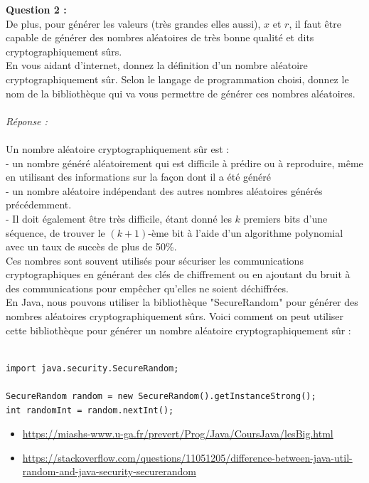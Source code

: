 \documentclass[a4paper,11pt]{article}
\begin{document}
        \label{subsec:Q2}
        \textbf{Question 2 : \\}De plus, pour générer les valeurs (très grandes elles aussi), $x$ et $r$, il faut être capable de générer des nombres aléatoires de très bonne qualité et dits cryptographiquement sûrs.\\En vous aidant d’internet, donnez la définition d’un nombre aléatoire cryptographiquement sûr. Selon le langage de programmation choisi, donnez le nom de la bibliothèque qui va vous permettre de générer ces nombres aléatoires.\\ \textit{\\Réponse :}\\\\Un nombre aléatoire cryptographiquement sûr est :\\ - un nombre généré aléatoirement qui est difficile à prédire ou à reproduire, même en utilisant des informations sur la façon dont il a été généré\\ - un nombre aléatoire indépendant des autres nombres aléatoires générés précédemment.\\ - Il doit également être très difficile, étant donné les $k$ premiers bits d'une séquence, de trouver le $(k+1)$-ème bit à l'aide d'un algorithme polynomial avec un taux de succès de plus de 50\%.\\ Ces nombres sont souvent utilisés pour sécuriser les communications cryptographiques en générant des clés de chiffrement ou en ajoutant du bruit à des communications pour empêcher qu'elles ne soient déchiffrées.\\
En Java, nous pouvons utiliser la bibliothèque "SecureRandom" pour générer des nombres aléatoires cryptographiquement sûrs. Voici comment on peut utiliser cette bibliothèque pour générer un nombre aléatoire cryptographiquement sûr :\\\\ \begin{lstlisting}
import java.security.SecureRandom;

SecureRandom random = new SecureRandom().getInstanceStrong();
int randomInt = random.nextInt();

\end{lstlisting}
\begin{itemize}
    \item \url{https://miashs-www.u-ga.fr/prevert/Prog/Java/CoursJava/lesBig.html}
    \item \url{https://stackoverflow.com/questions/11051205/difference-between-java-util-random-and-java-security-securerandom}
\end{itemize}
        
\end{document}

